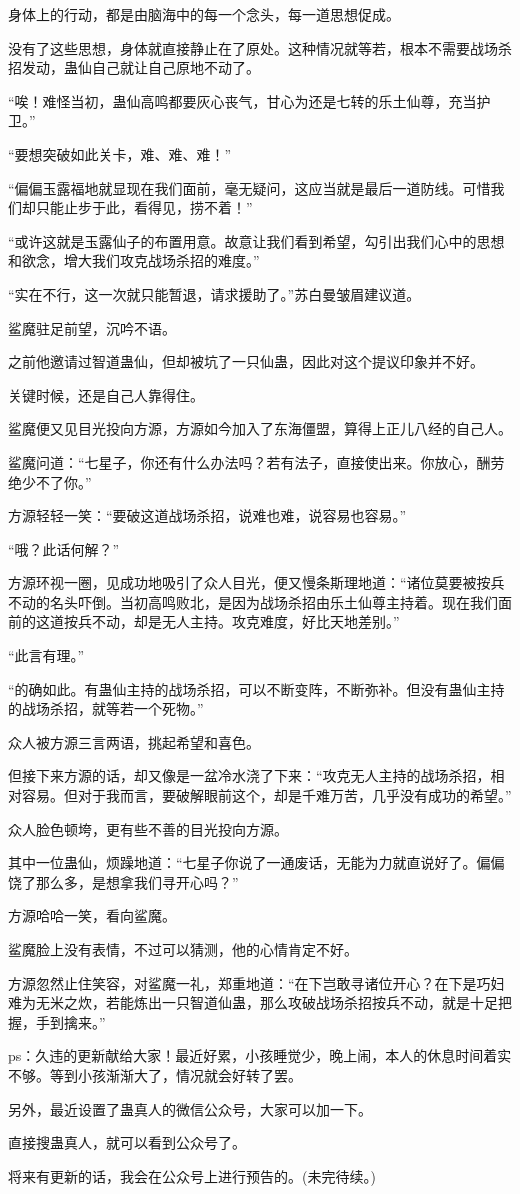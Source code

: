 \begin{this_body}
身体上的行动，都是由脑海中的每一个念头，每一道思想促成。

没有了这些思想，身体就直接静止在了原处。这种情况就等若，根本不需要战场杀招发动，蛊仙自己就让自己原地不动了。

“唉！难怪当初，蛊仙高鸣都要灰心丧气，甘心为还是七转的乐土仙尊，充当护卫。”

“要想突破如此关卡，难、难、难！”

“偏偏玉露福地就显现在我们面前，毫无疑问，这应当就是最后一道防线。可惜我们却只能止步于此，看得见，捞不着！”

“或许这就是玉露仙子的布置用意。故意让我们看到希望，勾引出我们心中的思想和欲念，增大我们攻克战场杀招的难度。”

“实在不行，这一次就只能暂退，请求援助了。”苏白曼皱眉建议道。

鲨魔驻足前望，沉吟不语。

之前他邀请过智道蛊仙，但却被坑了一只仙蛊，因此对这个提议印象并不好。

关键时候，还是自己人靠得住。

鲨魔便又见目光投向方源，方源如今加入了东海僵盟，算得上正儿八经的自己人。

鲨魔问道：“七星子，你还有什么办法吗？若有法子，直接使出来。你放心，酬劳绝少不了你。”

方源轻轻一笑：“要破这道战场杀招，说难也难，说容易也容易。”

“哦？此话何解？”

方源环视一圈，见成功地吸引了众人目光，便又慢条斯理地道：“诸位莫要被按兵不动的名头吓倒。当初高鸣败北，是因为战场杀招由乐土仙尊主持着。现在我们面前的这道按兵不动，却是无人主持。攻克难度，好比天地差别。”

“此言有理。”

“的确如此。有蛊仙主持的战场杀招，可以不断变阵，不断弥补。但没有蛊仙主持的战场杀招，就等若一个死物。”

众人被方源三言两语，挑起希望和喜色。

但接下来方源的话，却又像是一盆冷水浇了下来：“攻克无人主持的战场杀招，相对容易。但对于我而言，要破解眼前这个，却是千难万苦，几乎没有成功的希望。”

众人脸色顿垮，更有些不善的目光投向方源。

其中一位蛊仙，烦躁地道：“七星子你说了一通废话，无能为力就直说好了。偏偏饶了那么多，是想拿我们寻开心吗？”

方源哈哈一笑，看向鲨魔。

鲨魔脸上没有表情，不过可以猜测，他的心情肯定不好。

方源忽然止住笑容，对鲨魔一礼，郑重地道：“在下岂敢寻诸位开心？在下是巧妇难为无米之炊，若能炼出一只智道仙蛊，那么攻破战场杀招按兵不动，就是十足把握，手到擒来。”

ps：久违的更新献给大家！最近好累，小孩睡觉少，晚上闹，本人的休息时间着实不够。等到小孩渐渐大了，情况就会好转了罢。

另外，最近设置了蛊真人的微信公众号，大家可以加一下。

直接搜蛊真人，就可以看到公众号了。

将来有更新的话，我会在公众号上进行预告的。(未完待续。)

\end{this_body}

